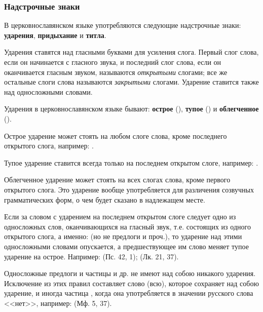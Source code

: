 \documentclass[11pt,a4paper,oneside]{memoir}
\newcommand{\mockitem}[1]{{\mock{#1}}}
\begin{document}
\subsubsection{Надстрочные знаки}

В церковнославянском языке употребляются следующие надстрочные знаки: \textbf{ударения}, \textbf{придыхание} и \textbf{титла}.

\bigskip
\mockitem{1. Ударения}
\medskip

Ударения ставятся над гласными буквами для усиления слога. Первый слог слова, если он начинается с гласного звука, и последний слог слова, если он оканчивается гласным звуком, называются \emph{открытыми} слогами; все же остальные слоги слова называются \emph{закрытыми} слогами. Ударение ставится также над односложными словами.

Ударения в церковнославянском языке бывают: \textbf{острое} ({}), \textbf{тупое} ({}) и \textbf{облегченное} ({}).

Острое ударение может стоять на любом слоге слова, кроме последнего открытого слога, например: {}.

Тупое ударение ставится всегда только на последнем открытом слоге, например: {}.

Облегченное ударение может стоять на всех слогах слова, кроме первого открытого слога. Это ударение вообще употребляется для различения созвучных грамматических форм, о чем будет сказано в надлежащем месте.

Если за словом с ударением на последнем открытом слоге следует одно из односложных слов, оканчивающихся на гласный звук, т.е. состоящих из одного открытого слога, а именно: {} (но не предлоги {} и проч.), то ударение над этими односложными словами опускается, а предшествующее им слово меняет тупое ударение на острое. Например: {} (Пс. 42, 1); {} (Лк. 21, 37).

Односложные предлоги и частицы {} и др. не имеют над собою никакого ударения. Исключение из этих правил составляет слово {} (всю), которое сохраняет над собою ударение, и иногда частица {}, когда она употребляется в значении русского слова <<нет>>, например: {} (Мф. 5, 37).
\end{document}
